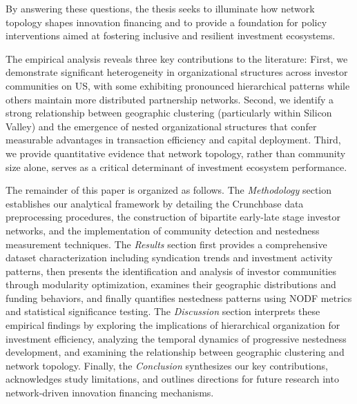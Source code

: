 By answering these questions, the thesis seeks to illuminate how network topology shapes innovation financing and to provide a foundation for policy interventions aimed at fostering inclusive and resilient investment ecosystems.

The empirical analysis reveals three key contributions to the literature: First, we demonstrate significant heterogeneity in organizational structures across investor communities on US, with some exhibiting pronounced hierarchical patterns while others maintain more distributed partnership networks. Second, we identify a strong relationship between geographic clustering (particularly within Silicon Valley) and the emergence of nested organizational structures that confer measurable advantages in transaction efficiency and capital deployment. Third, we provide quantitative evidence that network topology, rather than community size alone, serves as a critical determinant of investment ecosystem performance.

The remainder of this paper is organized as follows. The \textit{Methodology} section establishes our analytical framework by detailing the Crunchbase data preprocessing procedures, the construction of bipartite early-late stage investor networks, and the implementation of community detection and nestedness measurement techniques. The \textit{Results} section first provides a comprehensive dataset characterization including syndication trends and investment activity patterns, then presents the identification and analysis of investor communities through modularity optimization, examines their geographic distributions and funding behaviors, and finally quantifies nestedness patterns using NODF metrics and statistical significance testing. The \textit{Discussion} section interprets these empirical findings by exploring the implications of hierarchical organization for investment efficiency, analyzing the temporal dynamics of progressive nestedness development, and examining the relationship between geographic clustering and network topology. Finally, the \textit{Conclusion} synthesizes our key contributions, acknowledges study limitations, and outlines directions for future research into network-driven innovation financing mechanisms.

\pagebreak